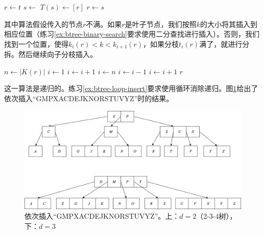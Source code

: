 \documentclass{ctexart}
\begin{document}
\begin{algorithmic}[1]
  \State $r \gets t$
   
    \State $s \gets$ 
    \State $T(s) \gets [ r ]$
    \State {}
    \State $r \gets s$
  \EndIf
  \State \Return {}
\EndFunction
\end{algorithmic}

其中算法假设传入的节点$r$不满。如果$r$是叶子节点，我们按照$k$的大小将其插入到相应位置（练习\ref{ex:btree-binary-search}要求使用二分查找进行插入）。否则，我们找到一个位置，使得$k_i(r) < k < k_{i+1}(r)$，如果分枝$t_i(r)$满了，就进行分拆。然后继续向子分枝插入。

\begin{algorithmic}[1]
  \State $n \gets |K(r)|$
    \State $i \gets 1$
      \State $i \gets i + 1$
    \EndWhile
    \State {}
  \Else
    \State $i \gets n$
      \State $i \gets i - 1$
    \EndWhile
      \State {}
        \State $i \gets i + 1$
      \EndIf
    \EndIf
    \State {}
  \EndIf
  \State \Return $r$
\EndFunction
\end{algorithmic}

这一算法是递归的。练习\ref{ex:btree-loop-insert}要求使用循环消除递归。图\ref{fig:btree-insert}给出了依次插入``GMPXACDEJKNORSTUVYZ''时的结果。

\begin{figure}[htbp]
  \centering
  \includegraphics[scale=0.5]{img/btree-split-insert-example.png}
  \caption{依次插入``GMPXACDEJKNORSTUVYZ''。上：$d = 2$（2-3-4树），下：$d = 3$}
  \label{fig:btree-insert}
\end{figure}
\end{document}
